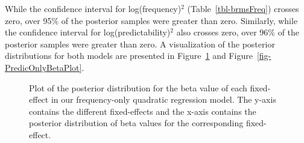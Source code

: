 \documentclass[
  authoryear,
  preprint,
  1p,
  onecolumn]{elsarticle}
\begin{document}
\begin{table}

\caption{\label{tbl-brmsPredic}Results for the Bayesian quadratic
regression model containing only predidctability and
predictability\(^2\).}


\end{table}%

While the confidence interval for log(frequency)\(^2\)
(Table~\ref{tbl-brmsFreq}) crosses zero, over 95\% of the posterior
samples were greater than zero. Similarly, while the confidence interval
for log(predictability)\(^2\) also crosses zero, over 96\% of the
posterior samples were greater than zero. A visualization of the
posterior distributions for both models are presented in
Figure~\ref{fig-FreqOnlyBetaPlot} and
Figure~\ref{fig-PredicOnlyBetaPlot}.

\begin{figure}


\caption{\label{fig-FreqOnlyBetaPlot}Plot of the posterior distribution
for the beta value of each fixed-effect in our frequency-only quadratic
regression model. The y-axis contains the different fixed-effects and
the x-axis contains the posterior distribution of beta values for the
corresponding fixed-effect.}

\end{figure}%
\end{document}
